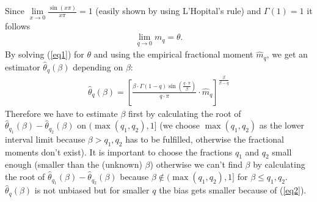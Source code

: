 \documentclass[10pt, a4paper]{article}\usepackage[]{graphicx}\usepackage[]{color}
\renewcommand{\le}{\leqslant} %
\begin{document}
Since $\lim\limits_{x \to 0}\frac{\sin(x\pi)}{x\pi} = 1$ (easily shown by using L'Hopital's rule) and $\Gamma(1)=1$ it follows 
\begin{align} \label{eq2}
	\lim\limits_{q \to 0} m_q = \theta.
\end{align}
By solving (\ref{eq1}) for $\theta$ and using the empirical fractional moment $\hat{m}_q$, we get an estimator $\hat{\theta}_q(\beta)$ depending on $\beta$:
\begin{align}
	\hat{\theta}_q(\beta)=\left[ \frac{\beta \cdot \Gamma(1-q)\sin(\frac{q \cdot \pi}{\beta})}{q \cdot \pi} \cdot \widehat{m}_q \right]^{\frac{\beta}{\beta-q}}
\end{align}
Therefore we have to estimate $\beta$ first by calculating the root of $\hat{\theta}_{q_1}(\beta)-\hat{\theta}_{q_2}(\beta)$ on $(\max(q_1,q_2),1]$ (we choose $\max(q_1,q_2)$ as the lower interval limit because $\beta>q_1,q_2$ has to be fulfilled, otherwise the fractional moments don't exist). 
It is important to choose the fractions $q_1$ and $q_2$ small enough (smaller than the (unknown) $\beta$) otherwise we can't find $\beta$ by calculating the root of $\hat{\theta}_{q_1}(\beta)-\hat{\theta}_{q_2}(\beta)$ because $\beta \notin (\max(q_1,q_2),1]$ for $\beta \le q_1,q_2$. $\hat{\theta}_q(\beta)$ is not unbiased but for smaller $q$ the bias gets smaller because of (\ref{eq2}).
\end{document}

